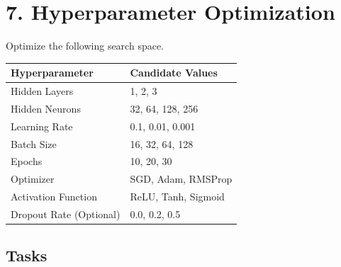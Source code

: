 \documentclass[11pt]{article}
\begin{document}
\section*{7. Hyperparameter Optimization}

Optimize the following search space.

\begin{center}
\begin{tabular}{|p{5cm}|p{7cm}|}
\hline
Hyperparameter & Candidate Values\\
\hline
Hidden Layers & 1, 2, 3\\
Hidden Neurons & 32, 64, 128, 256\\
Learning Rate & 0.1, 0.01, 0.001\\
Batch Size & 16, 32, 64, 128\\
Epochs & 10, 20, 30\\
Optimizer & SGD, Adam, RMSProp\\
Activation Function & ReLU, Tanh, Sigmoid\\
Dropout Rate (Optional) & 0.0, 0.2, 0.5\\
\hline
\end{tabular}
\end{center}

\subsection*{Tasks}
\end{document}
